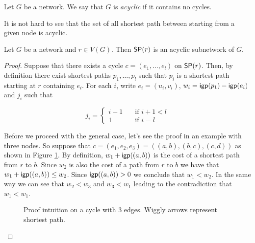 \begin{definition}
Let $G$ be a network. We say that $G$ is \emph{acyclic} if it contains no cycles.
\end{definition}

It is not hard to see that the set of all shortest path between starting from a given node is
acyclic.

\begin{lemma}
\label{lemma:dag}
Let $G$ be a network and $r \in V(G)$. Then $\sp(r)$ is an acyclic subnetwork of $G$.
\end{lemma}

\begin{proof}
Suppose that there exists a cycle $c = (e_1, \ldots, e_l)$ on $\sp(r)$.
Then, by definition
there exist shortest paths $p_1, \ldots, p_l$ such that $p_i$ is a shortest path starting at $r$ containing $e_i$.
For each $i$, write $e_i = (u_i, v_i)$, $w_i = \igp(p_1) - \igp(e_i)$ and $j_i$ such that

\[ j_i =
  \begin{cases}
    i + 1     & \quad \text{if } i + 1 < l \\
    1  & \quad \text{if } i = l
  \end{cases}
\]

Before we proceed with the general case, let's see the proof in an example with three nodes. 
So suppose that $c = (e_1, e_2, e_3) = ((a, b), (b, c), (c, d))$ as shown in
Figure \ref{fig:dag_intuition}. By definition, $w_1 + \igp((a, b))$ is the cost of a shortest path from $r$ to $b$. Since
$w_2$ is also the cost of a path from $r$ to $b$ we have that $w_1 + \igp((a, b)) \leq w_2$. Since $\igp((a, b)) > 0$
we conclude that $w_1 < w_2$. In the same way we can see that $w_2 < w_3$ and $w_3 < w_1$ leading to
the contradiction that $w_1 < w_1$.

\begin{figure}[H]
\begin{center}
\end{center}
\caption{Proof intuition on a cycle with $3$ edges. Wiggly arrows represent shortest path.}
\label{fig:dag_intuition}
\end{figure}


\end{proof}
